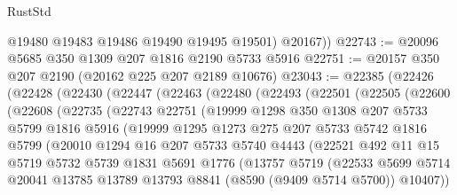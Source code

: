 \begin{lexlean}{RustStd}
\begin{coremodule}
          @19480
          @19483
          @19486
          @19490
          @19495
          @19501)
        @20167))
@22743 := @20096 @5685 @350 @1309 @207 @1816 @2190 @5733 @5916
@22751 := @20157 @350 @207 @2190 (@20162 @225 @207 @2189 @10676)
@23043 := @22385
    (@22426
      (@22428
        (@22430
          (@22447
            (@22463
              (@22480
                (@22493
                  (@22501
                    (@22505
                      (@22600
                        (@22608
                          (@22735
                            (@22743
                              @22751
                              (@19999
                                @1298
                                @350
                                @1308
                                @207
                                @5733
                                @5799
                                @1816
                                @5916
                                (@19999
                                  @1295
                                  @1273
                                  @275
                                  @207
                                  @5733
                                  @5742
                                  @1816
                                  @5799
                                  (@20010
                                    @1294
                                    @16
                                    @207
                                    @5733
                                    @5740
                                    @4443
                                    (@22521
                                      @492
                                      @11
                                      @15
                                      @5719
                                      @5732
                                      @5739
                                      @1831
                                      @5691
                                      @1776
                                      (@13757
                                        @5719
                                        (@22533
                                          @5699
                                          @5714
                                          @20041
                                          @13785
                                          @13789
                                          @13793
                                          @8841
                                          (@8590 (@9409 @5714 @5700))
                                          @10407))

\end{coremodule}
\end{lexlean}
